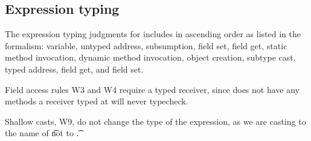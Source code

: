 \documentclass[acmlarge, anonymous, authordraft]{acmart}
\begin{document}
\begin{mathpar}
\end{mathpar}

\subsection{Expression typing}

The expression typing judgments for \kafka includes in ascending order as listed in the formalism:
variable, untyped address, subsumption, field set, field get, static method invocation, dynamic method invocation, object creation,
subtype cast,
typed address,  field get, and  field set.

Field access rules W3 and W4 require a typed receiver, since \any does not
have any methods a receiver typed at \any will never typecheck.

Shallow casts, W9, do not change the type of the expression, as we are casting
to the name of \t not to \t.  

~\\
\end{document}
